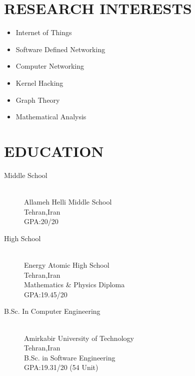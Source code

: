 \documentclass{res}
\begin{document}
\address{\bf PRESENT ADDRESS\\31 27th Avenue\\16th St.\\Amirabad St.\\Tehran, Iran}
\address{
	\bf CONTACT INFORMATION \\
	Email:\href{mailto:parham.alvani@gmail.com}{parham.alvani@gmail.com} \\
	Phone:		+98-912-449-3153  \\
	Homepage:\href{http://1995parham.github.io}{1995parham.github.io}
}

\begin{resume}
	\section{RESEARCH INTERESTS}
	
	\begin{itemize}
		\item Internet of Things
		\item Software Defined Networking
		\item Computer Networking
		\item Kernel Hacking
		\item Graph Theory
		\item Mathematical Analysis
	\end{itemize}
	
	\section{EDUCATION}
	
	\begin{description}
		\item[Middle School] \hfill \\
			Allameh Helli Middle School \hfill \\
			Tehran,Iran \hfill \\
			GPA:20/20			
		\item[High School] \hfill \\
			Energy Atomic High School \hfill \\
			Tehran,Iran \hfill \\
			Mathematics \& Physics Diploma \hfill \\
			GPA:19.45/20
		\item[B.Sc. In Computer Engineering] \hfill \\
			Amirkabir University of Technology \hfill \\
			Tehran,Iran \hfill \\
			B.Sc. in Software Engineering \hfill \\
			GPA:19.31/20 (54 Unit)
	\end{description}
	

\end{resume}
\end{document}

